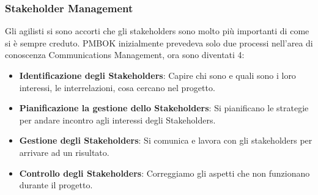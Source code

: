 \subsubsection{Stakeholder Management}
Gli agilisti si sono accorti che gli stakeholders sono molto più importanti di come si è sempre creduto.
PMBOK inizialmente prevedeva solo due processi nell'area di conoscenza Communications Management, ora sono diventati 4:
\begin{itemize}
	\item \textbf{Identificazione degli Stakeholders}: Capire chi sono e quali sono i loro interessi, le interrelazioni, cosa cercano nel progetto.
	\item \textbf{Pianificazione la gestione dello Stakeholders}: Si pianificano le strategie per andare incontro agli interessi degli Stakeholders.
	\item \textbf{Gestione degli Stakeholders}: Si comunica e lavora con gli stakeholders per arrivare ad un risultato.
	\item \textbf{Controllo degli Stakeholders}:  Correggiamo gli aspetti che non funzionano durante il progetto.
\end{itemize}
